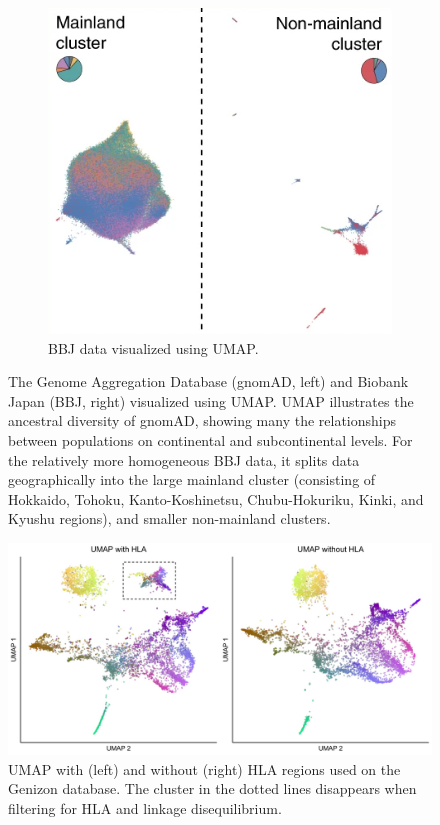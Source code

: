 \documentclass[12pt]{article}
\begin{document}
\begin{figure}[h!]
\begin{subfigure}[b]{0.49\linewidth}
    \includegraphics[width=\linewidth]{external_images/BBJ_UMAP.png}
    \caption{BBJ data visualized using UMAP.}
    \label{fig:BBJ_UMAP}
  \end{subfigure}
  \caption{The Genome Aggregation Database (gnomAD, left) and Biobank Japan (BBJ, right) visualized using UMAP. UMAP illustrates the ancestral diversity of gnomAD, showing many the relationships between populations on continental and subcontinental levels. For the relatively more homogeneous BBJ data, it splits data geographically into the large mainland cluster (consisting of Hokkaido, Tohoku, Kanto-Koshinetsu, Chubu-Hokuriku, Kinki, and Kyushu regions), and smaller non-mainland clusters.}
  \label{fig:external_UMAP}
\end{figure}

\clearpage

\begin{figure}[h!]
  \centering
    \includegraphics[width=\linewidth]{external_images/umap_hla_comparison_highlighted.jpg}
  \caption{UMAP with (left) and without (right) HLA regions used on the Genizon database. The cluster in the dotted lines disappears when filtering for HLA and linkage disequilibrium.}
  \label{fig:HLA}
\end{figure}
\end{document}
